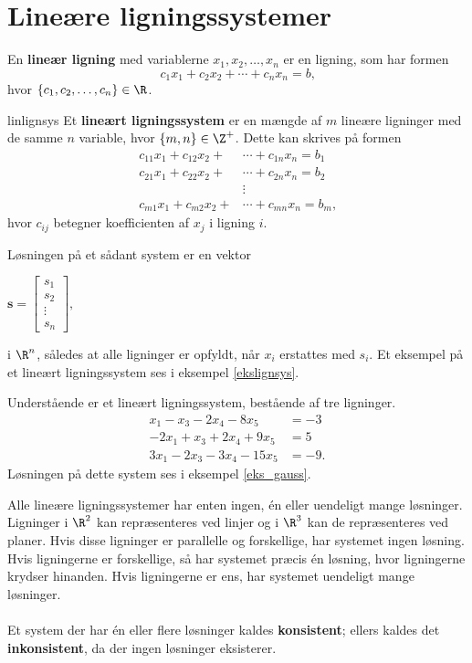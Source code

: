 \section{Lineære ligningssystemer }
%
En \textbf{lineær ligning} med variablerne $x_1,x_2,\ldots ,x_n$ er en ligning, som har formen
$$ c_1x_1+c_2x_2+\cdots+c_nx_n=b \text{,}$$ 
hvor $\{c_1,c_2,\ldots,c_n\} \in \R$. 
%
\begin{defn}{}{linlignsys}
Et \textbf{lineært ligningssystem} er en mængde af $m$ lineære ligninger med de samme $n$ variable, hvor $\{m, n\} \in \Z^+$.
Dette kan skrives på formen
\begin{align*}
c_{11}x_1+c_{12}x_2+&\cdots+c_{1n}x_n=b_1\\
c_{21}x_1+c_{22}x_2+&\cdots+c_{2n}x_n=b_2\\
&\vdots\\
c_{m1}x_1+c_{m2}x_2+&\cdots +c_{mn}x_n=b_m
\text{,}
\end{align*}
hvor $c_{ij}$ betegner koefficienten af $x_j$ i ligning $i$.
\end{defn}
\noindent
Løsningen på et sådant system er en vektor
\begin{center}
$
\mathbf{s} = 
\begin{bmatrix}
s_1\\
s_2\\
\vdots\\
s_n
\end{bmatrix},
$
\end{center}
i $\R ^n$, således at alle ligninger er opfyldt, når $x_i$ erstattes med $s_i$. Et eksempel på et lineært ligningssystem ses i eksempel \ref{ekslignsys}.
%
\\
\begin{eks}
\label{eks:lignsys}
Understående er et lineært ligningssystem, bestående af tre ligninger.
%
\begin{align*}
x_1-x_3-2x_4-8x_5&=-3 \\
-2x_1+x_3+2x_4+9x_5&=5 \\
3x_1-2x_3-3x_4-15x_5&=-9.
\end{align*}
%
Løsningen på dette system ses i eksempel \ref{eks_gauss}.
%
%
\end{eks}
Alle lineære ligningssystemer har enten ingen, én eller uendeligt mange løsninger.
Ligninger i $\R^2$ kan repræsenteres ved linjer og i $\R^3$ kan de repræsenteres ved planer.
Hvis disse ligninger er parallelle og forskellige, har systemet ingen løsning.
Hvis ligningerne er forskellige, så har systemet præcis én løsning, hvor ligningerne krydser hinanden. 
Hvis ligningerne er ens, har systemet uendeligt mange løsninger.\\\\
Et system der har én eller flere løsninger kaldes \textbf{konsistent}; ellers kaldes det \textbf{inkonsistent}, da der ingen løsninger eksisterer.
%
%
%
